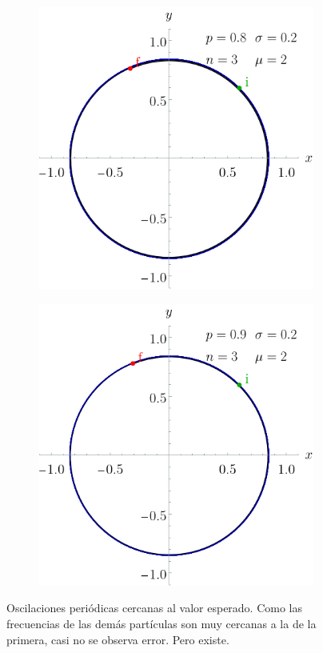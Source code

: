 \begin{figure}[ht!]
    \centering
    \begin{subfigure}{0.5\textwidth}
      \centering
      \includegraphics[width=0.9\linewidth]{chapter3/figures_separable/sphere_traject_ALL_sigmaz_normal_freq_mean=2_std=0.2_n=3_p=0.8_both.png}
    \end{subfigure}%
    \begin{subfigure}{0.5\textwidth}
      \centering
      \includegraphics[width=0.9\linewidth]{chapter3/figures_separable/sphere_traject_ALL_sigmaz_normal_freq_mean=2_std=0.2_n=3_p=0.9_both.png}
    \end{subfigure}
    \caption{Oscilaciones periódicas cercanas al valor esperado. Como las frecuencias de las demás partículas son muy cercanas a la de la primera, casi no se observa error. Pero existe. }\label{fig:Oscilations12}
\end{figure}

